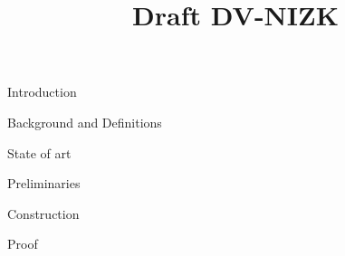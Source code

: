 



\pagestyle{plain}

\title{Draft DV-NIZK}

\maketitle

\begin{section}{Introduction}

\end{section}

\begin{section}{Background and Definitions}

\end{section}

\begin{section}{State of art}

\end{section}

\begin{section}{Preliminaries}

\end{section}

\begin{section}{Construction}

\end{section}

\begin{section}{Proof}

\end{section}










